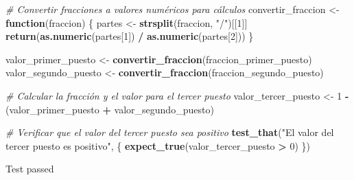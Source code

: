 \documentclass[
]{article}
\newenvironment{Shaded}{\begin{snugshade}}{\end{snugshade}}
\newcommand{\CommentTok}[1]{\textcolor[rgb]{0.56,0.35,0.01}{\textit{#1}}}
\newcommand{\ControlFlowTok}[1]{\textcolor[rgb]{0.13,0.29,0.53}{\textbf{#1}}}
\newcommand{\DecValTok}[1]{\textcolor[rgb]{0.00,0.00,0.81}{#1}}
\newcommand{\FunctionTok}[1]{\textcolor[rgb]{0.13,0.29,0.53}{\textbf{#1}}}
\newcommand{\NormalTok}[1]{#1}
\newcommand{\OtherTok}[1]{\textcolor[rgb]{0.56,0.35,0.01}{#1}}
\newcommand{\SpecialCharTok}[1]{\textcolor[rgb]{0.81,0.36,0.00}{\textbf{#1}}}
\newcommand{\StringTok}[1]{\textcolor[rgb]{0.31,0.60,0.02}{#1}}
\begin{document}
\begin{Shaded}
\begin{Highlighting}[]
\CommentTok{\# Convertir fracciones a valores numéricos para cálculos}
\NormalTok{convertir\_fraccion }\OtherTok{\textless{}{-}} \ControlFlowTok{function}\NormalTok{(fraccion) \{}
\NormalTok{  partes }\OtherTok{\textless{}{-}} \FunctionTok{strsplit}\NormalTok{(fraccion, }\StringTok{"/"}\NormalTok{)[[}\DecValTok{1}\NormalTok{]]}
  \FunctionTok{return}\NormalTok{(}\FunctionTok{as.numeric}\NormalTok{(partes[}\DecValTok{1}\NormalTok{]) }\SpecialCharTok{/} \FunctionTok{as.numeric}\NormalTok{(partes[}\DecValTok{2}\NormalTok{]))}
\NormalTok{\}}

\NormalTok{valor\_primer\_puesto }\OtherTok{\textless{}{-}} \FunctionTok{convertir\_fraccion}\NormalTok{(fraccion\_primer\_puesto)}
\NormalTok{valor\_segundo\_puesto }\OtherTok{\textless{}{-}} \FunctionTok{convertir\_fraccion}\NormalTok{(fraccion\_segundo\_puesto)}

\CommentTok{\# Calcular la fracción y el valor para el tercer puesto}
\NormalTok{valor\_tercer\_puesto }\OtherTok{\textless{}{-}} \DecValTok{1} \SpecialCharTok{{-}}\NormalTok{ (valor\_primer\_puesto }\SpecialCharTok{+}\NormalTok{ valor\_segundo\_puesto)}

\CommentTok{\# Verificar que el valor del tercer puesto sea positivo}
\FunctionTok{test\_that}\NormalTok{(}\StringTok{"El valor del tercer puesto es positivo"}\NormalTok{, \{}
  \FunctionTok{expect\_true}\NormalTok{(valor\_tercer\_puesto }\SpecialCharTok{\textgreater{}} \DecValTok{0}\NormalTok{)}
\NormalTok{\})}
\end{Highlighting}
\end{Shaded}

Test passed
\end{document}
